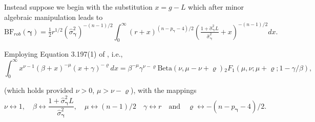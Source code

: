 \documentclass[12pt]{article}
\def\vectorfonttwo{\boldsymbol}
\def\vgamma{{\vectorfonttwo \gamma}}             %
\def\ds{\displaystyle}
\begin{document}
Instead suppose we begin with the substitution $x = g - L$ which after minor algebraic manipulation
leads to
$$
\ds \mbox{BF}_{{rob}}(\vgamma)
= \tfrac{1}{2} r^{1/2} \left( \widehat{\sigma}_\vgamma^2\right)^{-(n-1)/2} 
\int_0^\infty  (r + x)^{(n - p_\vgamma-4)/2}
\left(  \tfrac{1 +  \widehat{\sigma}_\vgamma^2L}{\widehat{\sigma}_\vgamma^2} +  x \right)^{-(n-1)/2} dx.
$$

\noindent Employing Equation 3.197(1) of \cite{Gradshteyn2007}, i.e.,
$$
\int_0^\infty x^{\nu - 1}(\beta + x)^{-\mu}(x + \gamma)^{-\varrho} dx
= \beta^{-\mu}
\gamma^{\nu - \varrho} 
\mbox{Beta}(\nu,\mu - \nu + \varrho)
{}_2F_1(\mu,\nu;\mu+\varrho; 1 - \gamma/\beta),
$$

\noindent (which holds provided $\nu>0$, $\mu > \nu - \varrho$), with the mappings
$$
\nu \leftrightarrow 1,
\quad 
\beta \leftrightarrow \frac{1 +  \widehat{\sigma}_\vgamma^2L}{\widehat{\sigma}_\vgamma^2},
\quad 
\mu \leftrightarrow (n-1)/2
\quad 
\gamma \leftrightarrow r
\quad \mbox{and} \quad 
\varrho \leftrightarrow -(n - p_\vgamma-4)/2.
$$
\end{document}
